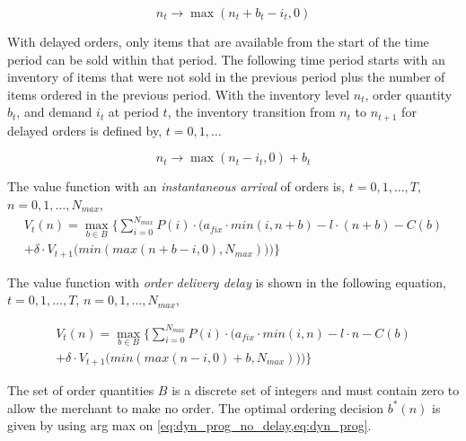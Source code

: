 \begin{equation}
	n_t \rightarrow \max(n_t + b_t - i_t, 0)
\end{equation}

With delayed orders, only items that are available from the start of the time period can be sold within that period.
The following time period starts with an inventory of items that were not sold in the previous period plus the number of items ordered in the previous period.
With the inventory level $n_t$, order quantity $b_t$, and demand $i_t$ at period $t$, the inventory transition from $n_t$ to $n_{t+1}$ for delayed orders is defined by, $t = 0, 1, \ldots$

\begin{equation}
n_t \rightarrow \max(n_t - i_t, 0) + b_t
\end{equation}

The value function with an \textit{instantaneous arrival} of orders is, $t=0,1,\ldots,T$, $n=0,1,\ldots,N_{max}$,
\begin{equation}
\begin{split}
V_t(n) = \max_{b \in B} \Bigg\{
\sum_{i = 0}^{N_{max}}
P(i) \cdot \Big(
a_{fix} \cdot min(i, n + b) %
- l \cdot (n + b) %
- C(b) %
 \\
+ \delta \cdot V_{t+1}\big(min(max(n + b - i, 0), N_{max})\big)
\Big)\Bigg\}
\end{split}
\label{eq:dyn_prog_no_delay}
\end{equation}

The value function with \textit{order delivery delay} is shown in the following equation, $t=0,1,\ldots,T$, $n=0,1,\ldots,N_{max}$,

\begin{equation}
\begin{split}
V_t(n) = \max_{b \in B} \Bigg\{
	\sum_{i = 0}^{N_{max}} 
		P(i) \cdot \Big(
			a_{fix} \cdot min(i, n) %
			- l \cdot n %
			- C(b) %
		 \\
		+ \delta \cdot V_{t+1}\big(min(max(n - i, 0) + b, N_{max})\big)
	\Big)\Bigg\}
\end{split}
\label{eq:dyn_prog}
\end{equation}

The set of order quantities $B$ is a discrete set of integers and must contain zero to allow the merchant to make no order.
The optimal ordering decision $b^*(n)$ is given by using arg max on \cref{eq:dyn_prog_no_delay,eq:dyn_prog}.

